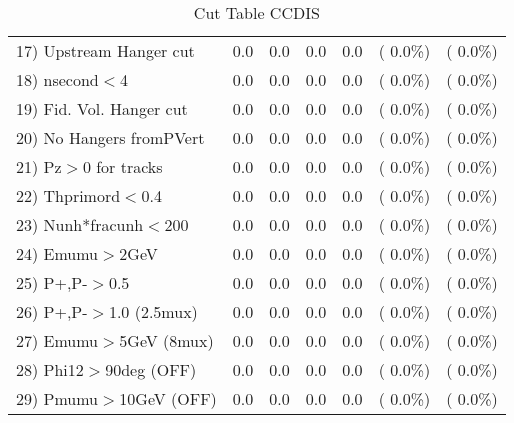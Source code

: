 \begin{table}[h!]
\begin{tabular}{||l||r|r|r|r|r|r||}
 17) Upstream Hanger cut  &          0.0 &          0.0 &          0.0 &          0.0 & (  0.0\%) & (  0.0\%) \\
 18) nsecond$<$4          &          0.0 &          0.0 &          0.0 &          0.0 & (  0.0\%) & (  0.0\%) \\
 19) Fid. Vol. Hanger cut &          0.0 &          0.0 &          0.0 &          0.0 & (  0.0\%) & (  0.0\%) \\
 20) No Hangers fromPVert &          0.0 &          0.0 &          0.0 &          0.0 & (  0.0\%) & (  0.0\%) \\
 21) Pz$>$0 for tracks    &          0.0 &          0.0 &          0.0 &          0.0 & (  0.0\%) & (  0.0\%) \\
 22) Thprimord$<$0.4      &          0.0 &          0.0 &          0.0 &          0.0 & (  0.0\%) & (  0.0\%) \\
 23) Nunh*fracunh$<$200   &          0.0 &          0.0 &          0.0 &          0.0 & (  0.0\%) & (  0.0\%) \\
 24) Emumu$>$2GeV         &          0.0 &          0.0 &          0.0 &          0.0 & (  0.0\%) & (  0.0\%) \\
 25) P+,P-$>$0.5          &          0.0 &          0.0 &          0.0 &          0.0 & (  0.0\%) & (  0.0\%) \\
 26) P+,P-$>$1.0 (2.5mux) &          0.0 &          0.0 &          0.0 &          0.0 & (  0.0\%) & (  0.0\%) \\
 27) Emumu$>$5GeV  (8mux) &          0.0 &          0.0 &          0.0 &          0.0 & (  0.0\%) & (  0.0\%) \\
 28) Phi12$>$90deg  (OFF) &          0.0 &          0.0 &          0.0 &          0.0 & (  0.0\%) & (  0.0\%) \\
 29) Pmumu$>$10GeV  (OFF) &          0.0 &          0.0 &          0.0 &          0.0 & (  0.0\%) & (  0.0\%) \\
 \hline
 \hline
 \end{tabular}
 \caption{Cut Table  CCDIS    }
 \label{tab-cutcohjpsi-mumu_ncdis}
 \end{table}
